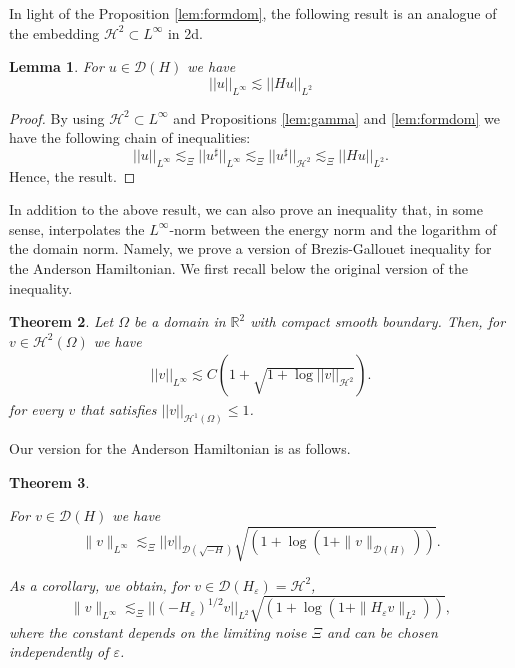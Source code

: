 \documentclass[11pt, oneside]{article}   	%
\newtheorem{theorem}{Theorem}[section]
\newtheorem{lemma}[theorem]{Lemma}
\newcommand{\ED}{\mathscr{D} ( \sqrt{-H})}
\newcommand{\ssp}{\mathscr{H}}
\begin{document}
In light of the Proposition \ref{lem:formdom}, the following result is an analogue of the embedding $\mathscr{H}^2 \subset L^\infty$ in 2d.
\begin{lemma} \label{lem:embedinfty}
For $u \in \mathscr{D}(H)$ we have
\[
||u||_{L^\infty} \lesssim ||Hu||_{L^2}
\]
\end{lemma}
\begin{proof}
By using $\mathscr{H}^2 \subset L^\infty$ and  Propositions \ref{lem:gamma} and \ref{lem:formdom} we have the following chain of inequalities:
\[
||u||_{L^\infty} \lesssim_\Xi ||u^\sharp||_{L^\infty}  \lesssim_\Xi  ||u^\sharp||_{\mathscr{H}^2} \lesssim_\Xi  ||Hu||_{L^2}.
\]
Hence, the result.
\end{proof}
In addition to the above result,  we can also prove an inequality that, in some sense, interpolates the  $L^\infty$-norm between the energy norm and the logarithm of the domain norm.  Namely, we  prove a version of Brezis-Gallouet inequality for the Anderson Hamiltonian.  We first recall below the original version of the inequality.

\begin{theorem} \cite{brga80}
	Let $\Omega$ be a domain in $\mathbb{R}^2$ with compact smooth boundary.  Then, for $v \in \mathscr{H}^2(\Omega)$ we have
	\begin{align*}
	||v||_{L^\infty}\lesssim C \left( 1+ \sqrt{1+\log||v||_{\ssp^2}}\right).
	\end{align*}
	for every $v$ that satisfies $||v||_{\mathscr{H}^1(\Omega)} \leq 1$.
\end{theorem}

Our version for the Anderson Hamiltonian is as follows.

\begin{theorem}\label{lem:brgaineq}

		For $v \in \mathscr{D}(H)$ we have
		\[ \| v \|_{L^{\infty}} \lesssim_\Xi||v||_{\ED}  \sqrt{(1 + \log (1+ \|v \|_{\mathscr{D}(H)}))}    . \]
	
	As a corollary, we obtain, for $v \in \mathscr{D}(H_\varepsilon)=\ssp^2$, 
		\[ \| v \|_{L^{\infty}} \lesssim_\Xi||(-H_\varepsilon)^{1/2}v||_{L^2}  \sqrt{(1 + \log (1+  \|H_\varepsilon v \|_{L^2}))}    , \]
		where the constant depends on the limiting noise $\Xi$ and can be chosen independently of $\varepsilon$.
		
	

\end{theorem}
\end{document}
